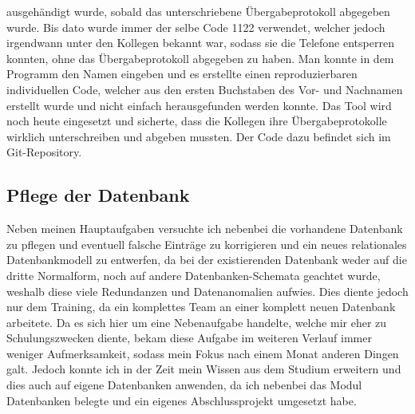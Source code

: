 ausgehändigt wurde, sobald das unterschriebene Übergabeprotokoll abgegeben wurde. Bis dato wurde immer der selbe Code 1122 verwendet, welcher jedoch irgendwann unter den Kollegen bekannt war, sodass sie die Telefone entsperren konnten, ohne das Übergabeprotokoll abgegeben zu haben. Man konnte in dem Programm den Namen eingeben und es erstellte einen reproduzierbaren individuellen Code, welcher aus den ersten Buchstaben des Vor- und Nachnamen erstellt wurde und nicht einfach herausgefunden werden konnte. Das Tool wird noch heute eingesetzt und sicherte, dass die Kollegen ihre Übergabeprotokolle wirklich unterschreiben und abgeben mussten. Der Code dazu befindet sich im Git-Repository.

\subsection{Pflege der Datenbank}
\label{sec:Pflege der Datenbank}

Neben meinen Hauptaufgaben versuchte ich nebenbei die vorhandene Datenbank zu pflegen und eventuell falsche Einträge zu korrigieren und ein neues relationales Datenbankmodell zu entwerfen, da bei der existierenden Datenbank weder auf die dritte Normalform, noch auf andere Datenbanken-Schemata geachtet wurde, weshalb diese viele Redundanzen und Datenanomalien aufwies. Dies diente jedoch nur dem Training, da ein komplettes Team an einer komplett neuen Datenbank arbeitete. Da es sich hier um eine Nebenaufgabe handelte, welche mir eher zu Schulungszwecken diente, bekam diese Aufgabe im weiteren Verlauf immer weniger Aufmerksamkeit, sodass mein Fokus nach einem Monat anderen Dingen galt. Jedoch konnte ich in der Zeit mein Wissen aus dem Studium erweitern und dies auch auf eigene Datenbanken anwenden, da ich nebenbei das Modul Datenbanken belegte und ein eigenes Abschlussprojekt umgesetzt habe. 